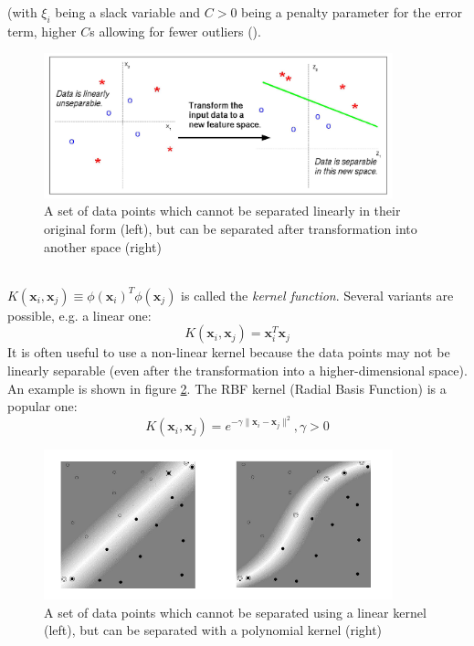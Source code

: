 (with $\xi_{i}$ being a slack variable and $C > 0$ being a penalty parameter for the error term, higher $C$s allowing for fewer outliers (\cite{article:intro_svm}).
\begin{figure}[htbp]
	\centering
	\includegraphics[width=0.9\textwidth]{images/svm_transformation.png}
	\caption{A set of data points which cannot be separated linearly in their original form (left), but can be separated after transformation into another space (right) \cite{article:intro_svm}}
	\label{fig:svm_transformation}
\end{figure}
\medskip
\\
$K(\mathbf{x}_{i},\mathbf{x}_{j}) \equiv \phi(\mathbf{x}_{i})^{T} \phi(\mathbf{x}_{j})$ is called the \textit{kernel function}. Several variants are possible, e.g. a linear one:
\begin{equation}
K(\mathbf{x}_{i},\mathbf{x}_{j}) = \mathbf{x}_{i}^{T}\mathbf{x}_{j}
\end{equation}
It is often useful to use a non-linear kernel because the data points may not be linearly separable (even after the transformation into a higher-dimensional space). An example is shown in figure \ref{fig:svm_kernels}. The RBF kernel (Radial Basis Function) is a popular one:
\begin{equation}
K(\mathbf{x}_{i},\mathbf{x}_{j}) = e^{-\gamma \parallel \mathbf{x}_{i} - \mathbf{x}_{j} \parallel^{2}}, \gamma > 0
\end{equation}
\begin{figure}[htbp]
	\centering
	\includegraphics[width=0.9\textwidth]{images/svm_kernels.png}
	\caption{A set of data points which cannot be separated using a linear kernel (left), but can be separated with a polynomial kernel (right) \cite{article:svm_tutorial}}
	\label{fig:svm_kernels}
\end{figure}
